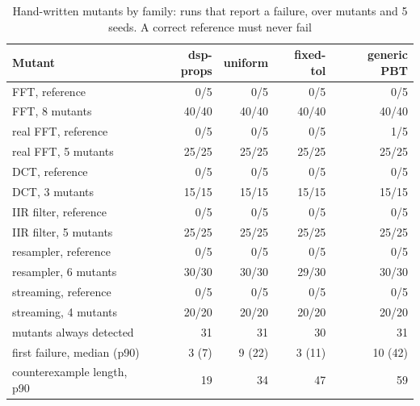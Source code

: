 \begin{table}[t]
\caption{Hand-written mutants by family: runs that report a failure, over mutants and 5 seeds. A correct reference must never fail}
\label{tab:hand}
\centering\scriptsize
\begin{tabular}{@{}lrrrr@{}}
\toprule
Mutant & dsp-props & uniform & fixed-tol & generic PBT \\
\midrule
FFT, reference & 0/5 & 0/5 & 0/5 & 0/5 \\
FFT, 8 mutants & 40/40 & 40/40 & 40/40 & 40/40 \\
real FFT, reference & 0/5 & 0/5 & 0/5 & 1/5 \\
real FFT, 5 mutants & 25/25 & 25/25 & 25/25 & 25/25 \\
DCT, reference & 0/5 & 0/5 & 0/5 & 0/5 \\
DCT, 3 mutants & 15/15 & 15/15 & 15/15 & 15/15 \\
IIR filter, reference & 0/5 & 0/5 & 0/5 & 0/5 \\
IIR filter, 5 mutants & 25/25 & 25/25 & 25/25 & 25/25 \\
resampler, reference & 0/5 & 0/5 & 0/5 & 0/5 \\
resampler, 6 mutants & 30/30 & 30/30 & 29/30 & 30/30 \\
streaming, reference & 0/5 & 0/5 & 0/5 & 0/5 \\
streaming, 4 mutants & 20/20 & 20/20 & 20/20 & 20/20 \\
\midrule
mutants always detected & 31 & 31 & 30 & 31 \\
first failure, median (p90) & 3 (7) & 9 (22) & 3 (11) & 10 (42) \\
counterexample length, p90 & 19 & 34 & 47 & 59 \\
\bottomrule
\end{tabular}
\end{table}

